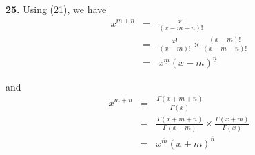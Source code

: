 \documentclass[a4paper,12pt]{article}
\newcommand{\newpar}[1]{\bigskip \noindent \textbf{#1.}}
\begin{document}
\newpar{25} Using (21), we have
\begin{eqnarray*}
  x^{\underline{m+n}} &=& \frac{x!}{(x-m-n)!} \\
  &=& \frac{x!}{(x-m)!} \times \frac{(x-m)!}{(x-m-n)!} \\
  &=& x^{\underline{m}}(x-m)^{\underline{n}}
\end{eqnarray*}

and
\begin{eqnarray*}
  x^{\overline{m+n}} &=& \frac{\Gamma(x+m+n)}{\Gamma(x)} \\
  &=& \frac{\Gamma(x+m+n)}{\Gamma(x+m)} \times
  \frac{\Gamma(x+m)}{\Gamma(x)} \\
  &=& x^{\overline{m}}(x+m)^{\overline{n}}
\end{eqnarray*}
\end{document}

